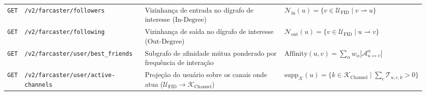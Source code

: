 \documentclass[11pt,a4paper]{article}
\begin{document}
\begin{longtable}{@{}p{1.15cm}>{\raggedright\arraybackslash}p{5.65cm}>{\raggedright\arraybackslash}p{4.15cm}>{\raggedright\arraybackslash}p{4.85cm}@{}}
\texttt{GET} & \texttt{/v2/farcaster/followers} & Vizinhança de entrada no dígrafo de interesse ($\text{In-Degree}$) & $\mathcal{N}_{\text{in}}(u) = \{v \in \mathcal{U}_{\text{FID}} \mid v \rightharpoonup u\}$ \\
\rowcolor{slateBg}
\texttt{GET} & \texttt{/v2/farcaster/following} & Vizinhança de saída no dígrafo de interesse ($\text{Out-Degree}$) & $\mathcal{N}_{\text{out}}(u) = \{v \in \mathcal{U}_{\text{FID}} \mid u \rightharpoonup v\}$ \\
\texttt{GET} & \texttt{/v2/farcaster/user/best\_friends} & Subgrafo de afinidade mútua ponderado por frequência de interação & $\text{Affinity}(u,v) = \sum_{\alpha} w_\alpha |\mathcal{A}_{u \leftrightarrow v}^\alpha|$ \\
\rowcolor{slateBg}
\texttt{GET} & \texttt{/v2/farcaster/user/active-channels} & Projeção do usuário sobre os canais onde atua ($\mathcal{U}_{\text{FID}} \to \mathcal{K}_{\text{Channel}}$) & $\text{supp}_{\mathcal{K}}(u) = \{k \in \mathcal{K}_{\text{Channel}} \mid \sum_c \mathcal{T}_{u,c,k} > 0\}$ \\
\end{longtable}
\end{document}
